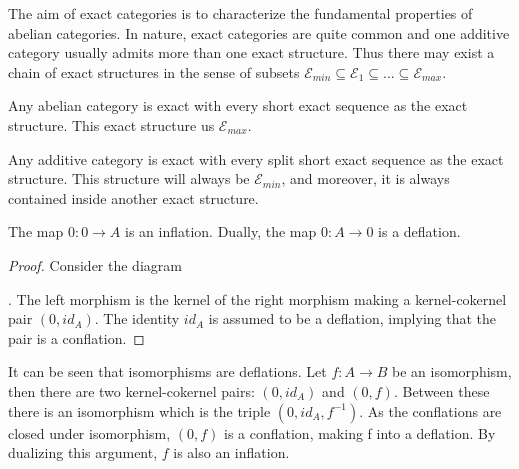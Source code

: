     The aim of exact categories is to characterize the fundamental properties of abelian categories. In nature, exact categories are quite common and one additive category usually admits more than one exact structure. Thus there may exist a chain of exact structures in the sense of subsets $\mathcal{E}_{min} \subseteq \mathcal{E}_1 \subseteq ... \subseteq \mathcal{E}_{max}$. 

    \begin{example}
        Any abelian category is exact with every short exact sequence as the exact structure. This exact structure us $\mathcal{E}_{max}$.
    \end{example}

    \begin{example}
        Any additive category is exact with every split short exact sequence as the exact structure. This structure will always be $\mathcal{E}_{min}$, and moreover, it is always contained inside another exact structure.
    \end{example}

    \begin{lemma}
        The map $0:0\rightarrow A$ is an inflation. Dually, the map $0:A\rightarrow 0$ is a deflation.
    \end{lemma}

    \begin{proof}
        Consider the diagram . The left morphism is the kernel of the right morphism making a kernel-cokernel pair $(0,id_A)$. The identity $id_A$ is assumed to be a deflation, implying that the pair is a conflation.
    \end{proof}

    \begin{remark}
        It can be seen that isomorphisms are deflations. Let $f:A\rightarrow B$ be an isomorphism, then there are two kernel-cokernel pairs: $(0,id_A)$ and $(0,f)$. Between these there is an isomorphism which is the triple $(0,id_A,f^{-1})$. As the conflations are closed under isomorphism, $(0,f)$ is a conflation, making f into a deflation. By dualizing this argument, $f$ is also an inflation.
        \begin{center}
        \end{center}
    \end{remark}

